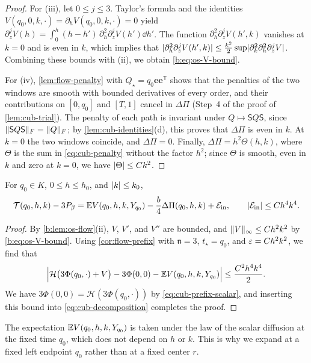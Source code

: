 \begin{proof}
For (iii), let $0\le j\le3$. Taylor's formula and the identities
$V(q_0,0,k,\cdot)=\partial_hV(q_0,0,k,\cdot)=0$ yield
$\partial_z^jV(h)=\int_0^h(h-h')\,\partial_h^2\partial_z^jV(h')\dd h'$. The function
$\partial_h^2\partial_z^jV(h',k)$ vanishes at $k=0$ and is even in $k$, which
implies that $\lvert \partial_h^2\partial_z^jV(h',k)\rvert\le\frac{k^2}2\sup\lvert \partial_k^2
\partial_h^2\partial_z^jV\rvert$. Combining these bounds with (ii), we obtain
\eqref{b:eq:os-V-bound}.

For (iv), \cref{lem:flow-penalty} with $Q_\star=q_0\mathbf e\mathbf e^{\mathsf T}$
shows that the penalties of the two windows are smooth with bounded
derivatives of every order, and their contributions on $[0,q_0]$ and $[T,1]$
cancel in $\Delta\Pi$ (Step~4 of the proof of \cref{lem:cub-trial}). The
penalty of each path is invariant under $Q\mapsto\mathsf SQ\mathsf S$, since
$\lVert \mathsf SQ\mathsf S\rVert_F=\lVert Q\rVert_F$; by \cref{lem:cub-identities}(d), this
proves that $\Delta\Pi$ is even in $k$. At $k=0$ the two windows coincide, and
$\Delta\Pi=0$. Finally, $\Delta\Pi=h^2\Theta(h,k)$, where $\Theta$ is the sum in
\eqref{eq:cub-penalty} without the factor $h^2$; since $\Theta$ is smooth, even in
$k$ and zero at $k=0$, we have $\lvert \Theta\rvert\le Ck^2$.
\end{proof}

\begin{corollary}\label{cor:cub-prefix}
For $q_0\in K$, $0\le h\le h_0$, and $\lvert k\rvert\le k_0$,
\[
 \mathcal T(q_0,h,k)-3P_\beta
 =\mathbb E V(q_0,h,k,Y_{q_0})-\frac b4\Delta\Pi(q_0,h,k)+\mathcal E_{\rm in},
 \qquad\lvert \mathcal E_{\rm in}\rvert\le Ch^4k^4.
\]
\end{corollary}

\begin{proof}
By \cref{b:lem:os-flow}(ii), $V$, $V'$, and $V''$ are bounded, and
$\lVert V\rVert_\infty\le Ch^2k^2$ by \eqref{b:eq:os-V-bound}. Using \cref{cor:flow-prefix}
with $\mathfrak n=3$, $t_\star=q_0$, and $\varepsilon=Ch^2k^2$, we find that
\[
 \Bigl|\mathcal H\bigl(3\Phi(q_0,\cdot)+V\bigr)-3\Phi(0,0)
 -\mathbb E V(q_0,h,k,Y_{q_0})\Bigr|\le\frac{C^2h^4k^4}2.
\]
We have $3\Phi(0,0)=\mathcal H(3\Phi(q_0,\cdot))$ by \eqref{eq:cub-prefix-scalar},
and inserting this bound into \eqref{eq:cub-decomposition} completes the proof.
\end{proof}

The expectation $\mathbb E V(q_0,h,k,Y_{q_0})$ is taken under the law of the scalar
diffusion at the fixed time $q_0$, which does not depend on $h$ or $k$. This is
why we expand at a fixed left endpoint $q_0$ rather than at a fixed center $r$.

